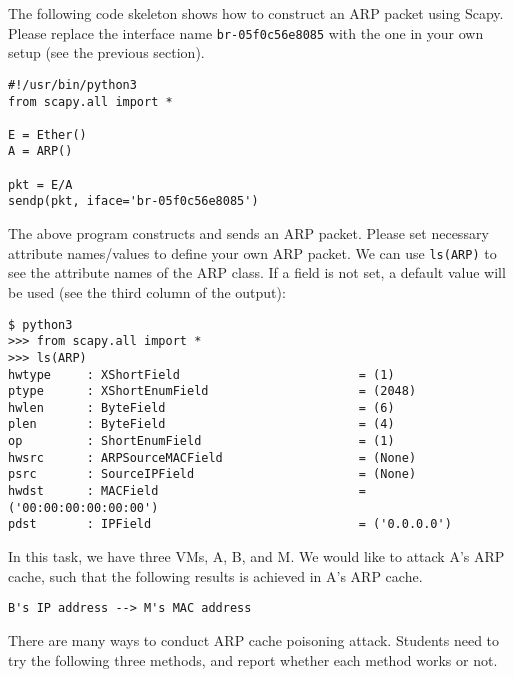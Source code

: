 The following code skeleton shows how to construct an ARP packet using Scapy. 
Please replace the interface name \texttt{br-05f0c56e8085} with the one in your 
own setup (see the previous section). 

\begin{lstlisting}
#!/usr/bin/python3
from scapy.all import *

E = Ether()
A = ARP()

pkt = E/A
sendp(pkt, iface='br-05f0c56e8085')
\end{lstlisting}

The above program constructs and sends an ARP packet. Please set necessary attribute
names/values to define your own ARP packet. We can use \texttt{ls(ARP)} to see the attribute
names of the ARP class. If a field is not set, a default value will be used (see the third
column of the output):

\begin{lstlisting}
$ python3
>>> from scapy.all import *
>>> ls(ARP)
hwtype     : XShortField                         = (1)
ptype      : XShortEnumField                     = (2048)
hwlen      : ByteField                           = (6)
plen       : ByteField                           = (4)
op         : ShortEnumField                      = (1)
hwsrc      : ARPSourceMACField                   = (None)
psrc       : SourceIPField                       = (None)
hwdst      : MACField                            = ('00:00:00:00:00:00')
pdst       : IPField                             = ('0.0.0.0')
\end{lstlisting}

In this task, we have three VMs, A, B, and M. We would like to attack A's ARP cache, such that
the following results is achieved in A's ARP cache. 

\begin{lstlisting}
B's IP address --> M's MAC address
\end{lstlisting}

There are many ways to conduct ARP cache poisoning attack. Students need to try the following
three methods, and report whether each method works or not.

